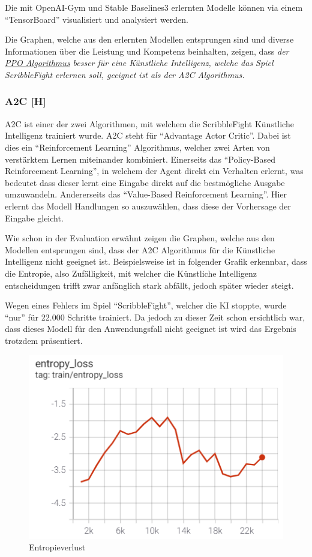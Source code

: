 Die mit OpenAI-Gym und Stable Baselines3 erlernten Modelle können via einem ``TensorBoard'' visualisiert und analysiert werden.

Die Graphen, welche aus den erlernten Modellen entsprungen sind und diverse Informationen über die Leistung und Kompetenz beinhalten,
zeigen, dass \textit{der \underline{PPO Algorithmus} besser für eine Künstliche Intelligenz, welche das Spiel ScribbleFight erlernen soll, geeignet ist als der A2C Algorithmus.}

\subsubsection{A2C [H]}

A2C ist einer der zwei Algorithmen, mit welchem die ScribbleFight Künstliche Intelligenz trainiert wurde.
A2C steht für ``Advantage Actor Critic''. Dabei ist dies ein ``Reinforcement Learning'' Algorithmus, welcher
zwei Arten von verstärktem Lernen miteinander kombiniert. Einerseits das ``Policy-Based Reinforcement Learning'', in welchem
der Agent direkt ein Verhalten erlernt, was bedeutet dass dieser lernt eine Eingabe direkt auf die bestmögliche Ausgabe umzuwandeln.
Andererseits das ``Value-Based Reinforcement Learning''. Hier erlernt das Modell Handlungen so auszuwählen, dass
diese der Vorhersage der Eingabe gleicht.

Wie schon in der Evaluation erwähnt zeigen die Graphen, welche aus den Modellen entsprungen sind, dass der A2C Algorithmus für
die Künstliche Intelligenz nicht geeignet ist. Beispielsweise ist in folgender Grafik erkennbar, dass die Entropie, also Zufälligkeit, mit welcher die Künstliche Intelligenz
entscheidungen trifft zwar anfänglich stark abfällt, jedoch später wieder steigt.

Wegen eines Fehlers im Spiel ``ScribbleFight'', welcher die KI stoppte, wurde ``nur'' für 22.000 Schritte trainiert.
Da jedoch zu dieser Zeit schon ersichtlich war, dass dieses Modell für den Anwendungsfall nicht geeignet ist wird das Ergebnis trotzdem präsentiert.

\begin{figure}[H]
    \centering
    \includegraphics[scale=0.7]{pics/Tensorboard/A2C/entropy_loss.png}
    \caption{Entropieverlust}
    \label{fig:a2c:entropyloss}
\end{figure}


